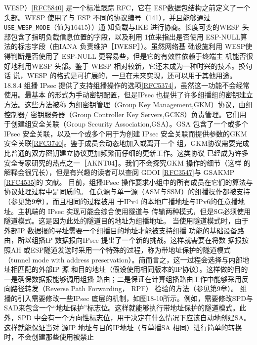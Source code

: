 WESP）\href{https://www.rfc-editor.org/rfc/rfc5840}{[RFC5840]} 是一个标准跟踪 RFC，它在 ESP数据包结构之前定义了一个头部。WESP
使用了与 ESP 不同的协议编号（141），并且能够通过 \verb|USE_WESP_MODE|（值为16415））通
知负载与IKE 进行协商。长度可变的WESP 头部包含了指明负载信息位置的字段，以及利用
1位来指出是否使用 ESP-NULL算法的标志字段（由IANA 负责维护［IWESP］）。虽然网络基
础设施利用 WESP使得判断是否使用了 ESP-NULL 更容易些，但是它的有效性依赖于终端主
机能否很好地利用WESP 头部。鉴于 WESP 相对较新，它还未成为一种时兴的技术。换句话
说，WESP 的格式是可扩展的，一旦在未来实现，还可以用于其他用途。
18.8.4 组播
IPsec 提供了支持组播操作的选项\href{https://www.rfc-editor.org/rfc/rfc5374}{[RFC5374]}，虽然这一功能不会经常使用。最基本
的形式为手动密钥配置，但是IPsec 也提供了许多组播组的密钥建立方法。这些方法被称
为组密钥管理（Group Key Management,GKM）协议，由组控制器/ 密钥服务器（Group
Controller Key Servers,GCKS）负责管理。它们用于创建组安全关联（Group Security
Association,GSA）。GSA 包含了一个或多个 IPsec 安全关联，以及一个或多个用于为创建
IPsec 安全关联而提供参数的GKM 安全关联\href{https://www.rfc-editor.org/rfc/rfc3740}{[RFC3740]}。鉴于成员会动态地加入或离开一个
组，GKM协议需要完成比普通的双方密钥建立协议更加频繁而仔细的更新工作。这类协议
已经成为许多安全专家研究的热点之一［AKNT04］。我们不会探究GKM 操作的细节（这样
的解释会很冗长），但是有兴趣的读者可以查阅 GDOI \href{https://www.rfc-editor.org/rfc/rfc3547}{[RFC3547]}与 GSAKMP \href{https://www.rfc-editor.org/rfc/rfc4535}{[RFC4535]}的
文献。
目前，组播IPsec 操作要求小组中的所有成员在它们的算法与协议处理过程中是同质的。
任意源与单一源（ASM与SSM）的组播操作都被支持（参见第9章），而且相同的过程被用
于IPv4 的本地广播地址与IPv6的任意播地址。主机端的 IPsec 实现可能会综合使用隧道与
传输两种模式，但是SG必须使用隧道模式。这是因为此处的隧道目的地址为组播地址。
当使用隧道模式时，由于外部IP 数据报的寻址需要一个组播目的地址才能被支持组播
功能的基础设备路由，所以组播IP 数据报向IPsec 提出了一个新的挑战。这样就需要在将数
据报按照AH 或ESP隧道发送时采用一个特殊的过程，称为带地址保护的隧道模式（tunnel
mode with address preservation）。简而言之，这一过程会选择与内部地址相匹配的外部IP 源
和目的地址（假设使用相同版本的IP协议）。这样做的目的一是确保数据报能够调用组播
路由；二是保证在计算组播路由工作中能够采用反向路径转发（Reverse Path Forwarding，
RPF） 检验的方法（参见第9章）。
组播的引入需要修改一些IPsec 底层的机制，如图18-10所示。例如，需要修改SPD与
SAD来包含一个“地址保护”标志位。这样就能够执行带地址保护的隧道模式。此外，SPD
中会有一个方向性标志位，用于决定在什么情况下应该自动地创建SA。这样就能保证当对
源IP 地址与目的IP地址（与单播SA 相同）进行简单的转换时，不会创建那些使用被禁止
